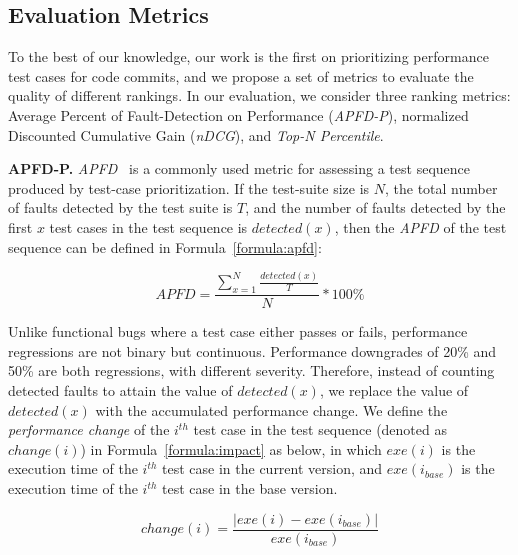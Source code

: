 \subsection{Evaluation Metrics}
\label{subsec:metrics}



To the best of our knowledge, our work is the first on prioritizing performance test cases for code commits, and we propose a set of metrics to evaluate the quality of different rankings. In our evaluation, we consider three ranking metrics: Average Percent of Fault-Detection on Performance (\textit{APFD-P}), normalized Discounted Cumulative Gain (\textit{nDCG}), and \textit{Top-N Percentile}. 

\textbf{APFD-P.} \textit{APFD}~\cite{AlexeyAPFD} is a commonly used metric for assessing a test sequence produced by test-case prioritization. If the test-suite size  is $N$, the total number of faults detected by the test suite is $T$, and the number of faults detected by the first $x$ test cases in the test sequence is $detected(x)$, then the \textit{APFD} of the test sequence can be defined in Formula~\ref{formula:apfd}:



\begin{equation}
APFD = \frac{\sum \limits_{x=1}^{N}\frac{detected(x)}{T}}{N} * 100\%
\label{formula:apfd}
\end{equation}


Unlike functional bugs where a test case either passes or fails, performance regressions are not binary but continuous. Performance downgrades of 20\% and 50\% are both regressions, with different severity. Therefore, instead of counting detected faults to attain the value of $detected(x)$, we replace the value of $detected(x)$ with the accumulated performance change. We define the \textit{performance change} of the $i^{th}$ test case in the test sequence (denoted as $change(i)$) in Formula~\ref{formula:impact} as below, in which $exe(i)$ is the execution time of the $i^{th}$ test case in the current version, and $exe(i_{base})$ is the execution time of the $i^{th}$ test case in the base version. 






\begin{equation}
change(i) = \frac{|exe(i) - exe(i_{base})|}{exe(i_{base})}
\label{formula:impact}
\end{equation}

